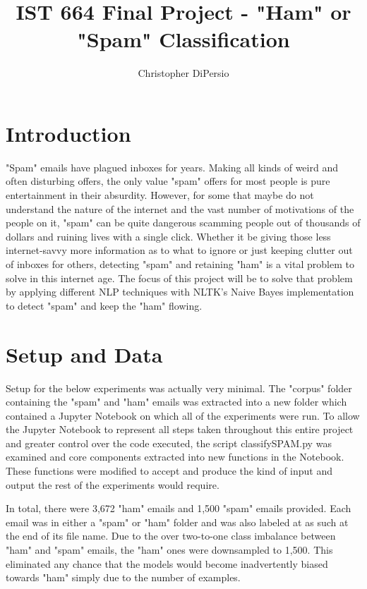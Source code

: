 \documentclass[a4paper]{article}
\begin{document}
	\title{IST 664 Final Project - "Ham" or "Spam" Classification}
	\date{}
	\author{Christopher DiPersio}
	\maketitle
	
	\section{Introduction}
	
	"Spam" emails have plagued inboxes for years. Making all kinds of weird and often disturbing offers, the only value "spam" offers for most people is pure entertainment in their absurdity. However, for some that maybe do not understand the nature of the internet and the vast number of motivations of the people on it, "spam" can be quite dangerous scamming people out of thousands of dollars and ruining lives with a single click. Whether it be giving those less internet-savvy more information as to what to ignore or just keeping clutter out of inboxes for others, detecting "spam" and retaining "ham" is a vital problem to solve in this internet age. The focus of this project will be to solve that problem by applying different NLP techniques with NLTK's Naive Bayes implementation to detect "spam" and keep the "ham" flowing.
	
	\section{Setup and Data}
	Setup for the below experiments was actually very minimal. The "corpus" folder containing the "spam" and "ham" emails was extracted into a new folder which contained a Jupyter Notebook on which all of the experiments were run. To allow the Jupyter Notebook to represent all steps taken throughout this entire project and greater control over the code executed, the script classifySPAM.py was examined and core components extracted into new functions in the Notebook. These functions were modified to accept and produce the kind of input and output the rest of the experiments would require.
	
	In total, there were 3,672 "ham" emails and 1,500 "spam" emails provided. Each email was in either a "spam" or "ham" folder and was also labeled at as such at the end of its file name. Due to the over two-to-one class imbalance between "ham" and "spam" emails, the "ham" ones were downsampled to 1,500. This eliminated any chance that the models would become inadvertently biased towards "ham" simply due to the number of examples.
	
\end{document}
